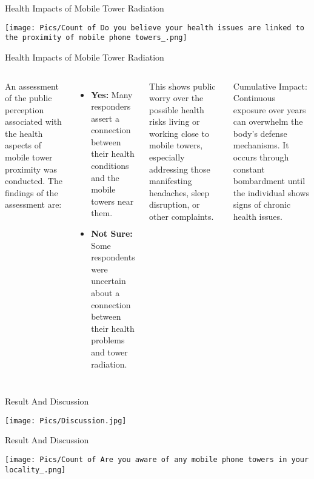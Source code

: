 \documentclass[7pt, aspectratio=169]{beamer}
\begin{document}
\begin{frame}{Health Impacts of Mobile Tower Radiation}
\begin{center}
    \texttt{[image: Pics/Count of Do you believe your health issues are linked to the proximity of mobile phone towers\_.png]}
\end{center}
    
\end{frame}

\begin{frame}{Health Impacts of Mobile Tower Radiation}
\begin{columns}
    An assessment of the public perception associated with the health aspects of mobile tower proximity was conducted. The findings of the assessment are:\\
    \begin{itemize}
        \item \textbf{Yes:} Many responders assert a connection between their health conditions and the mobile towers near them.
        \item \textbf{Not Sure:} Some respondents were uncertain about a connection between their health problems and tower radiation.
    \end{itemize}
    This shows public worry over the possible health risks living or working close to mobile towers, especially addressing those manifesting headaches, sleep disruption, or other complaints.
    \begin{block}{Cumulative Impact:}
        Continuous exposure over years can overwhelm the body's defense mechanisms. It occurs through constant bombardment until the individual shows signs of chronic health issues.
        
    \end{block}

    
\end{columns}
    
\end{frame}

\begin{frame}{Result And Discussion}
\begin{center}
    \texttt{[image: Pics/Discussion.jpg]}
\end{center}
    
\end{frame}
\begin{frame}{Result And Discussion}
\begin{center}
    \texttt{[image: Pics/Count of Are you aware of any mobile phone towers in your locality\_.png]}
\end{center}
\end{frame}
\end{document}
